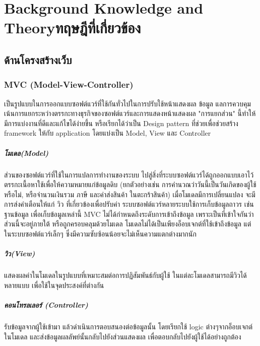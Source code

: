 \chapter{\ifenglish Background Knowledge and Theory\else ทฤษฎีที่เกี่ยวข้อง\fi}

\section{ด้านโครงสร้างเว็บ}
\subsection{MVC (Model-View-Controller)}
    เป็นรูปแบบในการออกแบบซอฟต์แวร์ที่ใช้กันทั่วไปในการปรับใช้หน้าแสดงผล ข้อมูล แลการควบคุม เน้นการแยกระหว่างตรรกะทางธุรกิจของซอฟต์แวร์และการแสดงหน้าแสดงผล "การแยกส่วน" นี้ทำให้มีการแบ่งงานที่ดีและแก้ไขได้ง่ายขึ้น หรือเรียกได้ว่าเป็น Design pattern ที่ช่วยเพื่อช่วยสร้าง framework ให้กับ application โดยแบ่งเป็น Model, View และ Controller

\paragraph*{โมเดล(Model)}
    ส่วนของซอฟต์แวร์ที่ใช้ในการแปลการทำงานของระบบ ไปสู่สิ่งที่ระบบซอฟต์แวร์ได้ถูกออกแบบเอาไว้ ตรรกะเนื้อหาใช้เพื่อให้ความหมายแก่ข้อมูลดิบ (ยกตัวอย่างเช่น การคำนวณว่าวันนี้เป็นวันเกิดของผู้ใช้หรือไม่, หรือจำนวนเงินรวม ภาษี และค่าส่งสินค้า ในตะกร้าสินค้า) เมื่อโมเดลมีการเปลี่ยนแปลง จะมีการส่งคำเตือนให้แก่ วิว ที่เกี่ยวข้องเพื่อปรับค่า
ระบบซอฟต์แวร์หลายระบบใช้การเก็บข้อมูลถาวร เช่น ฐานข้อมูล เพื่อเก็บข้อมูลเหล่านี้ MVC ไม่ได้กำหนดถึงระดับการเข้าถึงข้อมูล เพราะเป็นที่เข้าใจกันว่าส่วนนี้จะอยู่ภายใต้ หรือถูกครอบคลุมด้วยโมเดล โมเดลไม่ได้เป็นเพียงอ็อบเจกต์ที่ใช้เข้าถึงข้อมูล แต่ในระบบซอฟต์แวร์เล็กๆ ซึ่งมีความซับซ้อนน้อยจะไม่เห็นความแตกต่างมากนัก 

\paragraph*{วิว(View)}
    แสดงผลค่าในโมเดลในรูปแบบที่เหมาะสมต่อการปฏิสัมพันธ์กับผู้ใช้ ในแต่ละโมเดลสามารถมีวิวได้หลายแบบ เพื่อใช้ในจุดประสงค์ที่ต่างกัน 

\paragraph*{คอนโทรลเลอร์ (Controller)}
    รับข้อมูลจากผู้ใช้เข้ามา แล้วดำเนินการตอบสนองต่อข้อมูลนั้น โดยเรียกใช้ logic ต่างๆจากอ็อบเจกต์ในโมเดล และส่งข้อมูลผลลัพย์นั้นกลับไปยังส่วนแสดงผล เพื่อตอบกลับไปยังผู้ใช้ได้อย่างถูกต้อง 

